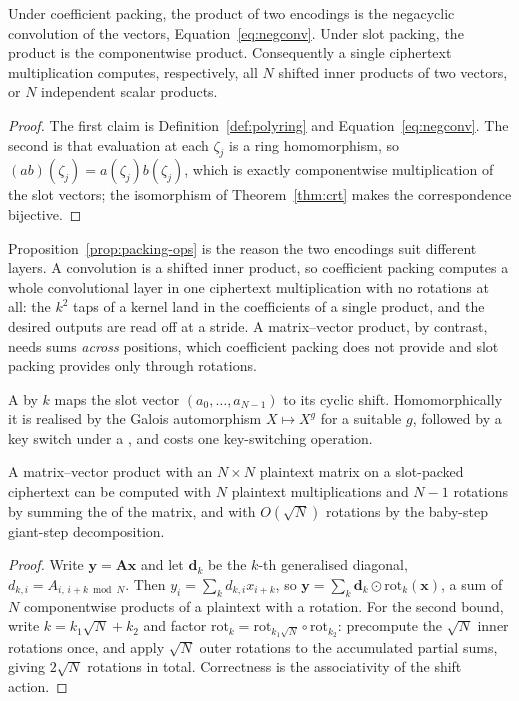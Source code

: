 \begin{proposition}
\label{prop:packing-ops}
Under coefficient packing, the product of two encodings is the negacyclic
convolution of the vectors, Equation~\eqref{eq:negconv}. Under slot packing, the
product is the componentwise product. Consequently a single ciphertext
multiplication computes, respectively, all $N$ shifted inner products of two
vectors, or $N$ independent scalar products.
\end{proposition}

\begin{proof}
The first claim is Definition~\ref{def:polyring} and
Equation~\eqref{eq:negconv}. The second is that evaluation at each $\zeta_j$ is a
ring homomorphism, so $(ab)(\zeta_j) = a(\zeta_j)b(\zeta_j)$, which is exactly
componentwise multiplication of the slot vectors; the isomorphism of
Theorem~\ref{thm:crt} makes the correspondence bijective.
\end{proof}

Proposition~\ref{prop:packing-ops} is the reason the two encodings suit different
layers. A convolution is a shifted inner product, so coefficient packing computes
a whole convolutional layer in one ciphertext multiplication with no rotations at
all: the $k^2$ taps of a kernel land in the coefficients of a single product, and
the desired outputs are read off at a stride. A matrix--vector product, by
contrast, needs sums \emph{across} positions, which coefficient packing does not
provide and slot packing provides only through rotations.

\begin{definition}
\label{def:rotation}
A  by $k$ maps the slot vector $(a_0,\dots,a_{N-1})$ to its cyclic
shift. Homomorphically it is realised by the Galois automorphism
$X \mapsto X^{g}$ for a suitable $g$, followed by a key switch under a
, and costs one key-switching operation.
\end{definition}

\begin{proposition}
\label{prop:hs-matvec}
A matrix--vector product with an $N \times N$ plaintext matrix on a slot-packed
ciphertext can be computed with $N$ plaintext multiplications and $N-1$ rotations
by summing the  of the matrix, and with
$O(\sqrt{N})$ rotations by the baby-step giant-step decomposition.
\end{proposition}

\begin{proof}
Write $\mathbf{y} = \mathbf{A}\mathbf{x}$ and let $\mathbf{d}_k$ be the $k$-th
generalised diagonal, $d_{k,i} = A_{i,\,i+k \bmod N}$. Then
$y_i = \sum_k d_{k,i} x_{i+k}$, so
$\mathbf{y} = \sum_{k} \mathbf{d}_k \odot \mathrm{rot}_k(\mathbf{x})$, a sum of
$N$ componentwise products of a plaintext with a rotation. For the second bound,
write $k = k_1 \sqrt{N} + k_2$ and factor
$\mathrm{rot}_k = \mathrm{rot}_{k_1\sqrt N} \circ \mathrm{rot}_{k_2}$: precompute
the $\sqrt N$ inner rotations once, and apply $\sqrt N$ outer rotations to the
accumulated partial sums, giving $2\sqrt N$ rotations in total. Correctness is the
associativity of the shift action.
\end{proof}

